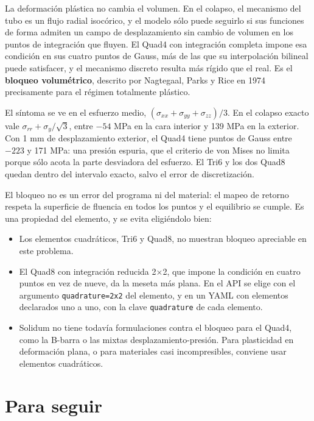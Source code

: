 \documentclass[11pt,oneside]{report}
\begin{document}
La deformación plástica no cambia el volumen. En el colapso, el mecanismo del tubo es un flujo radial isocórico, y el modelo sólo puede seguirlo si sus funciones de forma admiten un campo de desplazamiento sin cambio de volumen en los puntos de integración que fluyen. El Quad4 con integración completa impone esa condición en sus cuatro puntos de Gauss, más de las que su interpolación bilineal puede satisfacer, y el mecanismo discreto resulta más rígido que el real. Es el \textbf{bloqueo volumétrico}, descrito por Nagtegaal, Parks y Rice en 1974 precisamente para el régimen totalmente plástico.

El síntoma se ve en el esfuerzo medio, $(\sigma_{xx} + \sigma_{yy} + \sigma_{zz})/3$. En el colapso exacto vale $\sigma_{rr} + \sigma_y/\sqrt3$, entre $-54$ MPa en la cara interior y 139 MPa en la exterior. Con 1 mm de desplazamiento exterior, el Quad4 tiene puntos de Gauss entre $-223$ y 171 MPa: una presión espuria, que el criterio de von Mises no limita porque sólo acota la parte desviadora del esfuerzo. El Tri6 y los dos Quad8 quedan dentro del intervalo exacto, salvo el error de discretización.

El bloqueo no es un error del programa ni del material: el mapeo de retorno respeta la superficie de fluencia en todos los puntos y el equilibrio se cumple. Es una propiedad del elemento, y se evita eligiéndolo bien:

\begin{itemize}
  \item Los elementos cuadráticos, Tri6 y Quad8, no muestran bloqueo apreciable en este problema.
  \item El Quad8 con integración reducida 2\ensuremath{\times}2, que impone la condición en cuatro puntos en vez de nueve, da la meseta más plana. En el API se elige con el argumento \texttt{quadrature=\textquotedbl{}2x2\textquotedbl{}} del elemento, y en un YAML con elementos declarados uno a uno, con la clave \texttt{quadrature} de cada elemento.
  \item Solidum no tiene todavía formulaciones contra el bloqueo para el Quad4, como la B-barra o las mixtas desplazamiento-presión. Para plasticidad en deformación plana, o para materiales casi incompresibles, conviene usar elementos cuadráticos.
\end{itemize}

\section{Para seguir}
\end{document}
